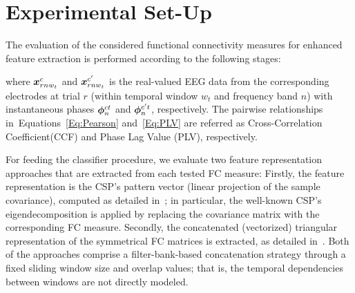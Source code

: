 \section{Experimental Set-Up}
The evaluation of the considered functional connectivity measures for enhanced feature extraction is performed according to the following stages: 


where $\bm {x}^{c}_{rnw_t}$ and $\bm {x}^{c'}_{rnw_t}$ is the real-valued EEG data from the corresponding electrodes at trial $r$ (within temporal window $w_t$ and frequency band $n$) with instantaneous phases $\bm {\phi}_n^{ct}$ and $\bm {\phi}_n^{c't}$, respectively. The pairwise relationships in~Equations~\eqref{Eq:Pearson} and~\eqref{Eq:PLV} are referred as {Cross-Correlation Coefficient}(CCF) and {Phase Lag Value} (PLV), respectively.

{For feeding the classifier procedure, we evaluate two feature representation approaches that are extracted from each tested FC measure: Firstly, the feature representation is the CSP's pattern vector (linear projection of the sample covariance), computed as detailed in~\cite{velasquez2020dynamic}; in particular, the well-known CSP's eigendecomposition is applied by replacing the covariance matrix with the corresponding FC measure. Secondly,  the concatenated (vectorized) triangular representation of the symmetrical FC matrices is extracted, as detailed in~\cite{barachant2013classification}. Both of the approaches comprise a filter-bank-based concatenation strategy through a fixed sliding window size and overlap values; that is, the temporal dependencies between windows are not directly modeled.}

